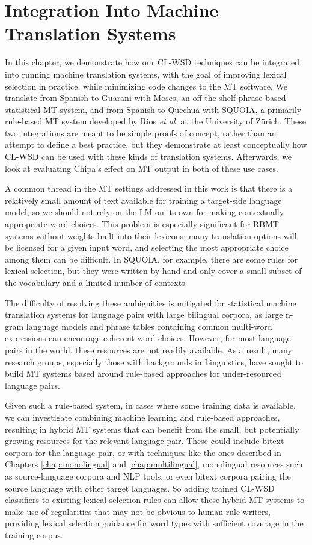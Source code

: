 \chapter{Integration Into Machine Translation Systems}
\label{chap:integration}
In this chapter, we demonstrate how our CL-WSD techniques can be integrated
into running machine translation systems, with the goal of improving lexical
selection in practice, while minimizing code changes to the MT software. We
translate from Spanish to Guarani with Moses\cite{koehn-EtAl:2007:PosterDemo},
an off-the-shelf phrase-based statistical MT system, and from Spanish to
Quechua with SQUOIA\cite{rios2015basic}, a primarily rule-based MT system
developed by Rios \emph{et al.} at the University of Zürich. These two
integrations are meant to be simple proofs of concept, rather than an attempt
to define a best practice, but they demonstrate at least conceptually how
CL-WSD can be used with these kinds of translation systems. Afterwards, we look
at evaluating Chipa's effect on MT output in both of these use cases.

A common thread in the MT settings addressed in this work is that there is a
relatively small amount of text available for training a target-side language
model, so we should not rely on the LM on its own for making contextually
appropriate word choices. This problem is especially significant for RBMT
systems without weights built into their lexicons; many translation options
will be licensed for a given input word, and selecting the most appropriate
choice among them can be difficult. In SQUOIA, for example, there are some
rules for lexical selection, but they were written by hand and only cover a
small subset of the vocabulary and a limited number of contexts.

The difficulty of resolving these ambiguities is mitigated for statistical
machine translation systems for language pairs with large bilingual corpora, as
large n-gram language models and phrase tables containing common multi-word
expressions can encourage coherent word choices. However, for most language
pairs in the world, these resources are not readily available. As a result,
many research groups, especially those with backgrounds in Linguistics, have
sought to build MT systems based around rule-based approaches for
under-resourced language pairs.

Given such a rule-based system, in cases where some training data is available,
we can investigate combining machine learning and rule-based approaches,
resulting in hybrid MT systems that can benefit from the small, but potentially
growing resources for the relevant language pair. These could include bitext
corpora for the language pair, or with techniques like the ones described in
Chapters \ref{chap:monolingual} and \ref{chap:multilingual}, monolingual
resources such as source-language corpora and NLP tools, or even bitext corpora
pairing the source language with other target languages. So adding trained
CL-WSD classifiers to existing lexical selection rules can allow these hybrid
MT systems to make use of regularities that may not be obvious to human
rule-writers, providing lexical selection guidance for word types with
sufficient coverage in the training corpus.

